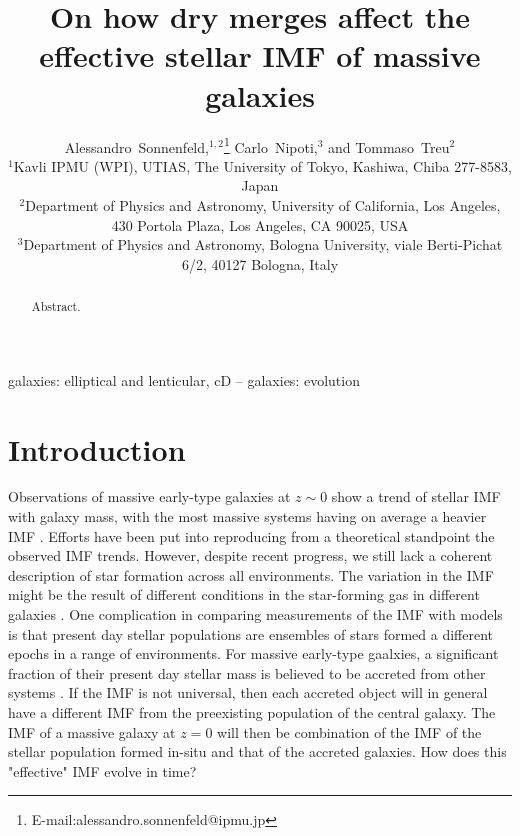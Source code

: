 \documentclass[usenatbib, letters]{mnras}
\begin{document}
\title{On how dry merges affect the effective stellar IMF of massive galaxies}
\author[Sonnenfeld et al.]{
Alessandro~Sonnenfeld,$^{1,2}$\thanks{E-mail:alessandro.sonnenfeld@ipmu.jp}
Carlo~Nipoti,$^{3}$
and Tommaso~Treu$^{2}$
\\
$^{1}$Kavli IPMU (WPI), UTIAS, The University of Tokyo, Kashiwa, Chiba 277-8583, Japan \\
$^{2}$Department of Physics and Astronomy, University of California, Los Angeles, 430 Portola Plaza, Los Angeles, CA 90025, USA \\
$^{3}$Department of Physics and Astronomy, Bologna University, viale Berti-Pichat 6/2, 40127 Bologna, Italy
}

\maketitle

\begin{abstract}
Abstract.
\end{abstract}

\begin{keywords}
   galaxies: elliptical and lenticular, cD -- galaxies: evolution
\end{keywords}

\section{Introduction}\label{sect:intro}

Observations of massive early-type galaxies at $z\sim0$ show a trend of stellar IMF with galaxy mass, with the most massive systems having on average a heavier IMF \citep{Tre++10,Cap++12}.
Efforts have been put into reproducing from a theoretical standpoint the observed IMF trends. However, despite recent progress, we still lack a coherent description of star formation across all environments.
The variation in the IMF might be the result of different conditions in the star-forming gas in different galaxies \citep{Hop13}.
One complication in comparing measurements of the IMF with models is that present day stellar populations are ensembles of stars formed a different epochs in a range of environments.
For massive early-type gaalxies, a significant fraction of their present day stellar mass is believed to be accreted from other systems \citep{vDo++10}.
If the IMF is not universal, then each accreted object will in general have a different IMF from the preexisting population of the central galaxy.
The IMF of a massive galaxy at $z=0$ will then be combination of the IMF of the stellar population formed in-situ and that of the accreted galaxies.
How does this "effective" IMF evolve in time?
\end{document}
